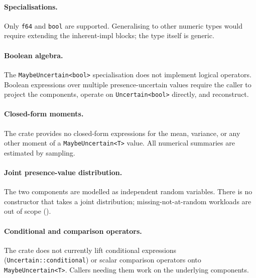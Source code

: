 \paragraph{Specialisations.} Only \texttt{f64} and \texttt{bool} are
supported. Generalising to other numeric types would require extending the
inherent-impl blocks; the type itself is generic.

\paragraph{Boolean algebra.} The \texttt{MaybeUncertain<bool>}
specialisation does not implement logical operators. Boolean expressions
over multiple presence-uncertain values require the caller to project the
components, operate on \texttt{Uncertain<bool>} directly, and reconstruct.

\paragraph{Closed-form moments.} The crate provides no closed-form
expressions for the mean, variance, or any other moment of a
\texttt{MaybeUncertain<T>} value. All numerical summaries are estimated by
sampling.

\paragraph{Joint presence-value distribution.} The two components are
modelled as independent random variables. There is no constructor that
takes a joint distribution; missing-not-at-random workloads are out of
scope ().

\paragraph{Conditional and comparison operators.} The crate does not
currently lift conditional expressions
(\texttt{Uncertain::conditional}) or scalar comparison operators onto
\texttt{MaybeUncertain<T>}. Callers needing them work on the underlying
components.
